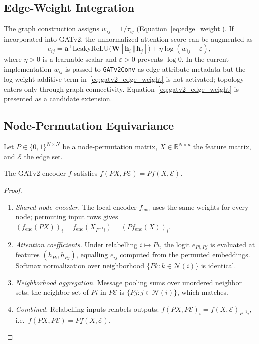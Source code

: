 \subsection{Edge-Weight Integration}
\label{sec:Appendix_GATv2_edge_weights}

The graph construction assigns $w_{ij}=1/\tau_{ij}$ (Equation~\ref{eq:edge_weight}). If incorporated into GATv2, the unnormalized attention score can be augmented as
\begin{equation}
  e_{ij} = \mathbf{a}^\top\mathrm{LeakyReLU}\!\bigl(\mathbf{W}[\mathbf{h}_i\,\Vert\,\mathbf{h}_j]\bigr)
           + \eta\log(w_{ij}+\varepsilon),
  \label{eq:gatv2_edge_weight}
\end{equation}
where $\eta>0$ is a learnable scalar and $\varepsilon>0$ prevents $\log 0$. In the current implementation $w_{ij}$ is passed to \texttt{GATv2Conv} as edge-attribute metadata but the log-weight additive term in~\eqref{eq:gatv2_edge_weight} is not activated; topology enters only through graph connectivity. Equation~\eqref{eq:gatv2_edge_weight} is presented as a candidate extension.

\subsection{Node-Permutation Equivariance}
\label{sec:Appendix_GATv2_equivariance}

Let $P\in\{0,1\}^{N\times N}$ be a node-permutation matrix, $X\in\mathbb{R}^{N\times d}$ the feature matrix, and $\mathcal{E}$ the edge set.

\begin{proposition}
\label{prop:gatv2_equivariance}
The GATv2 encoder $f$ satisfies $f(PX, P\mathcal{E}) = Pf(X,\mathcal{E})$.
\end{proposition}
\begin{proof}
\begin{enumerate}
\item \emph{Shared node encoder.} The local encoder $f_{\mathrm{enc}}$ uses the same weights for every node; permuting input rows gives $(f_{\mathrm{enc}}(PX))_i = f_{\mathrm{enc}}(X_{P^{-1}i}) = (Pf_{\mathrm{enc}}(X))_i$.
\item \emph{Attention coefficients.} Under relabelling $i\mapsto Pi$, the logit $e_{Pi,Pj}$ is evaluated at features $(h_{Pi},h_{Pj})$, equalling $e_{ij}$ computed from the permuted embeddings. Softmax normalization over neighborhood $\{Pk : k\in\mathcal{N}(i)\}$ is identical.
\item \emph{Neighborhood aggregation.} Message pooling sums over unordered neighbor sets; the neighbor set of $Pi$ in $P\mathcal{E}$ is $\{Pj : j\in\mathcal{N}(i)\}$, which matches.
\item \emph{Combined.} Relabelling inputs relabels outputs: $f(PX,P\mathcal{E})_i = f(X,\mathcal{E})_{P^{-1}i}$, i.e.\ $f(PX,P\mathcal{E})=Pf(X,\mathcal{E})$. \qedhere
\end{enumerate}
\end{proof}

